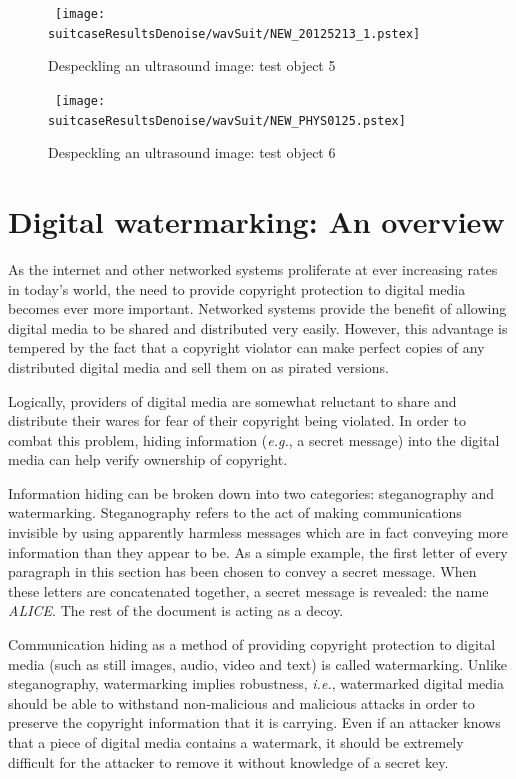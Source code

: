 \documentclass[12pt]{report}
\begin{document}
\begin{figure}[p]
\centerline{ \hbox{
        \texttt{[image: suitcaseResultsDenoise/wavSuit/NEW\_20125213\_1.pstex]}
}}
	\caption{Despeckling an ultrasound image: test object 5}
	\label{test5US}
\end{figure}

\begin{figure}[p]
\centerline{ \hbox{
        \texttt{[image: suitcaseResultsDenoise/wavSuit/NEW\_PHYS0125.pstex]}
}}
	\caption{Despeckling an ultrasound image: test object 6}
	\label{test6US}
\end{figure}


\chapter{Digital watermarking: An overview}
\label{chapter:wmIntro}
As the internet and other networked systems proliferate at ever increasing rates in today's world, the need
to provide copyright protection to digital media becomes ever more important.
Networked systems provide the benefit of allowing digital media
to be shared and distributed very easily. However, this advantage is tempered by the fact 
that a copyright violator can make perfect copies of any distributed digital media and
sell them on as pirated versions.

Logically, providers of digital media are somewhat reluctant to share and distribute their wares for 
fear of their copyright being violated.
In order to combat this problem, hiding information (\emph{e.g.}, a secret message) into the digital
media can help verify ownership of copyright.

Information hiding can be broken down into two categories: steganography and watermarking.
Steganography refers to the act of making communications invisible by using apparently
harmless messages which are in fact conveying more information than they appear to be.
As a simple example, the first letter of every paragraph in this section has been chosen to convey 
a secret message. When these letters are concatenated together, a secret message is revealed: the
name \emph{ALICE}.
The rest of the document is acting as a decoy.

Communication hiding as a method of providing copyright protection to digital media
(such as still images, audio, video and text) is called watermarking.
Unlike steganography, watermarking
implies robustness, \emph{i.e.}, watermarked digital media should be able to 
withstand non-malicious and malicious
attacks in order to preserve the copyright information that it is carrying.
Even if an attacker knows that a piece of digital media contains a watermark, it should be extremely difficult
for the attacker to remove it without knowledge of a secret key.
\end{document}
